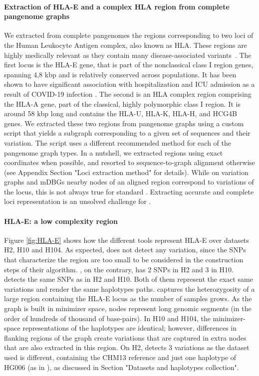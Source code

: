 \paragraph{\textbf{\textup{Extraction of HLA-E and a complex HLA region from complete pangenome graphs}}}
We extracted from complete pangenomes the regions corresponding to two loci of the Human Leukocyte Antigen complex, also known as HLA. These regions are highly medically relevant  as they contain many disease-associated variants~\cite{HLA-nature}.
The first locus is the HLA-E gene, that is part of the nonclassical class I region genes, spanning 4,8 kbp and is relatively conserved across populations.
It has been shown to have significant association with hospitalization and ICU admission as a result of COVID-19 infection \cite{hla-e-covid}.
The second is an HLA complex region comprising the HLA-A gene, part of the classical, highly polymorphic class I region. It is around 58 kbp long and contains the HLA-U, HLA-K, HLA-H, and HCG4B genes. 
We extracted these two regions from  pangenome graphs using a custom script that yields a subgraph corresponding to a given set of sequences and their variation. The script uses a different recommended method %
for each of the pangenome graph types. In a nutshell, we extracted regions using exact coordinates when possible, and resorted to sequence-to-graph alignment otherwise (see Appendix Section "Loci extraction method" for details). 
While on variation graphs and mDBGs nearby nodes of an aligned region correspond to variations of the locus, this is not always true for standard \dbgs. Extracting accurate and complete loci representation is an unsolved challenge for \dbgs. \\

\paragraph{\textbf{\textup{HLA-E: a low complexity region}}}
Figure \ref{fig:HLA-E} shows how the different tools represent HLA-E over datasets H2, H10 and H104. As expected, \minigraph does not detect any variation, since the SNPs that characterize the region are too small to be considered in the construction steps of their algorithm. \pggb, on the contrary, has 2 SNPs in H2 and 3 in H10. \bifrost detects the same SNPs as \pggb in H2 and H10. Both of them represent the exact same variations and render the same haplotypes paths. \mbox{\mdbg} captures the heterozygosity of a large region containing the HLA-E locus as the number of samples grows. As the \mbox{\mdbg} graph is built in minimizer space, nodes represent long genomic segments (in the order of hundreds of thousand of base-pairs). In H10 and H104, the minimizer-space representations of the haplotypes are identical; however, differences in flanking regions of the graph create variations that are captured in extra nodes that are also extracted in this region. On H2, \mcactus detects 3 variations as the dataset used is different, containing the CHM13 reference and just one haplotype of HG006 (as in \minigraph), as discussed in Section "Datasets and haplotypes collection". 

